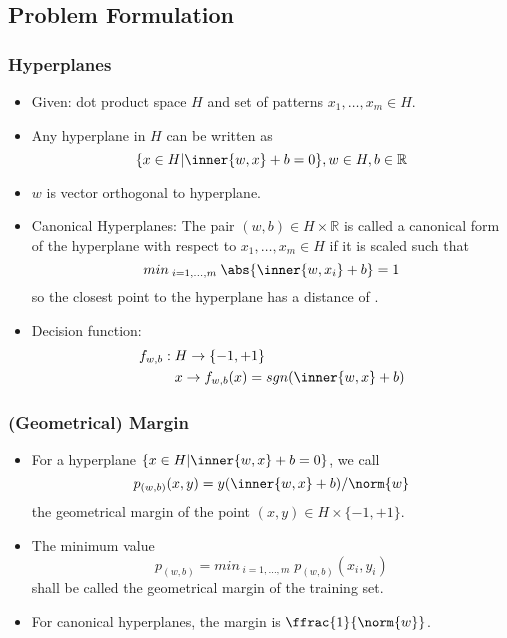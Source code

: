 \subsection*{Problem Formulation}
\subsubsection*{Hyperplanes}
\begin{itemize}
    \item
        Given: dot product space $H$ and set of patterns $x_{1}, \dots, x_{m} \in H$.
    \item
        Any hyperplane in $H$ can be written as 
        $$\{x \in H | \inner{w, x} + b = 0\}, w \in H, b \in \mathbb{R}$$
    \item
        $w$ is vector orthogonal to hyperplane.
    \item
        Canonical Hyperplanes: 
        The pair $(w,b) \in H \times \mathbb{R}$ is called a canonical form of the hyperplane with respect to $x_{1}, \dots, x_{m} \in H$ if it is scaled such that
        $$ min_{\; i=1, \dots, m \;} \abs{\inner{w, x_{i}} + b} = 1$$
        so the closest point to the hyperplane has a distance of .
    \item
        Decision function:
        \begin{align*}
        f_{w,b}: \; & H \rightarrow \{-1, +1\}\\
            & x \rightarrow f_{w,b}(x) = sgn(\inner{w,x}+b)
        \end{align*}
\end{itemize}

\subsubsection*{(Geometrical) Margin}
\begin{itemize}
    \item
        For a hyperplane $\{x \in H | \inner{w,x} +b = 0\}$, we call
        $$ p_{(w, b)}(x,y) = y(\inner{w,x}+b)/\norm{w}$$
        the geometrical margin of the point $(x,y) \in H \times \{-1, +1\}$.

    \item
        The minimum value
        $$ p_{(w, b)} = min_{\;i=1,\dots,m} \;p_{(w, b)}(x_{i},y_{i})$$
        shall be called the geometrical margin of the training set.
    \item
        For canonical hyperplanes, the margin is $\ffrac{1}{\norm{w}}$.
\end{itemize}

